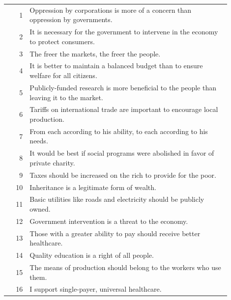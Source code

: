 \documentclass[11pt]{article}
\begin{document}
\begin{longtable}{r p{0.9\linewidth}}
\rowcolor{evEcon} 1  & Oppression by corporations is more of a concern than oppression by governments. \\
\rowcolor{evEcon} 2  & It is necessary for the government to intervene in the economy to protect consumers. \\
\rowcolor{evEcon} 3  & The freer the markets, the freer the people. \\
\rowcolor{evEcon} 4  & It is better to maintain a balanced budget than to ensure welfare for all citizens. \\
\rowcolor{evEcon} 5  & Publicly-funded research is more beneficial to the people than leaving it to the market. \\
\rowcolor{evEcon} 6  & Tariffs on international trade are important to encourage local production. \\
\rowcolor{evEcon} 7  & From each according to his ability, to each according to his needs. \\
\rowcolor{evEcon} 8  & It would be best if social programs were abolished in favor of private charity. \\
\rowcolor{evEcon} 9  & Taxes should be increased on the rich to provide for the poor. \\
\rowcolor{evEcon} 10 & Inheritance is a legitimate form of wealth. \\
\rowcolor{evEcon} 11 & Basic utilities like roads and electricity should be publicly owned. \\
\rowcolor{evEcon} 12 & Government intervention is a threat to the economy. \\
\rowcolor{evEcon} 13 & Those with a greater ability to pay should receive better healthcare. \\
\rowcolor{evEcon} 14 & Quality education is a right of all people. \\
\rowcolor{evEcon} 15 & The means of production should belong to the workers who use them. \\
\rowcolor{evEcon} 16 & I support single-payer, universal healthcare. \\


\end{longtable}
\end{document}

